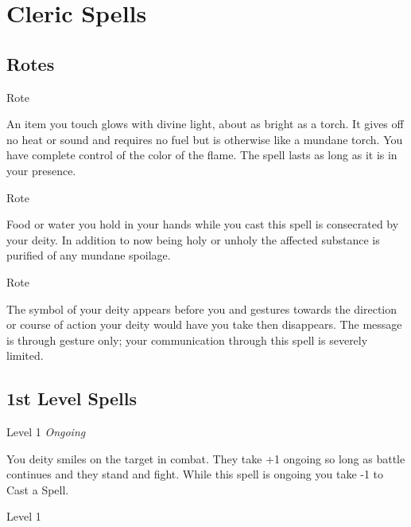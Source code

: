 \chapter{Cleric Spells}
   
 


\section{Rotes}   
 


\startSpellName
{} 	Rote
\stopSpellName
 

An item you touch glows with divine light, about as bright as a torch. It gives off no heat or sound and requires no fuel but is otherwise like a mundane torch. You have complete control of the color of the flame. The spell lasts as long as it is in your presence.



 
\startSpellName
{} 	Rote
\stopSpellName
 

Food or water you hold in your hands while you cast this spell is consecrated by your deity. In addition to now being holy or unholy the affected substance is purified of any mundane spoilage.

 
\startSpellName
{} 	Rote
\stopSpellName
 

The symbol of your deity appears before you and gestures towards the direction or course of action your deity would have you take then disappears. The message is through gesture only; your communication through this spell is severely limited.



 


\section{1st Level Spells}     
 
\startSpellName
{} 	Level 1	{\em Ongoing} 
\stopSpellName
 

You deity smiles on the target in combat. They take +1 ongoing so long as battle continues and they stand and fight. While this spell is ongoing you take -1 to Cast a Spell.

 
\startSpellName
{} 	Level 1
\stopSpellName
 

